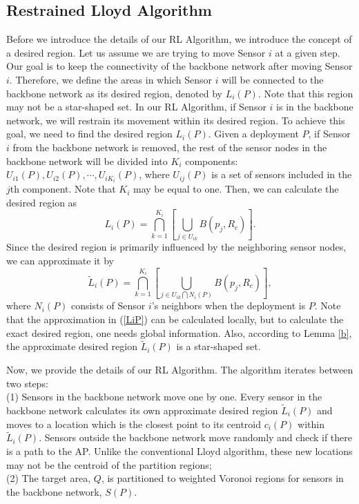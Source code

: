 \documentclass[journal,draftcls,onecolumn,12pt,twoside, narroweqnarray]{IEEEtran}
\begin{document}
\subsection{Restrained Lloyd Algorithm}
Before we introduce the details of our RL Algorithm, we introduce the concept of a desired region. Let us assume we are trying to move Sensor $i$ at a given step.
Our goal is to keep the connectivity of the backbone network after moving Sensor $i$. Therefore, we define the areas in which Sensor $i$ will be connected to the backbone network as its desired region, denoted by $L_i(P)$. Note that this region may not be a star-shaped set. In our RL Algorithm, if Sensor $i$ is in the backbone network, we will restrain its movement within its desired region. To achieve this goal, we need to find the desired region $L_i(P)$.
Given a deployment $P$, if Sensor $i$ from the backbone network is removed, the rest of the sensor nodes in the backbone network will be divided into $K_i$ components: $U_{i1}(P),U_{i2}(P),\cdots,U_{iK_i}(P)$, where $U_{ij}(P)$ is a set of sensors included in the $j$th component. Note that $K_i$ may be equal to one. Then, we can calculate the desired  region as
\begin{equation}
    L_i(P) = \bigcap_{k=1}^{K_i}\left[\bigcup_{j\in U_{ik}}B(p_j,R_c)\right].
\end{equation}
Since the desired region is primarily influenced by the neighboring sensor nodes, we can approximate it by
\begin{equation}
    \tilde{L}_i(P) = \bigcap_{k=1}^{K_i}\left[\bigcup_{j\in U_{ik}\bigcap N_i(P)}B(p_j,R_c)\right],\label{LiP}
\end{equation}
where $N_i(P)$ consists of Sensor $i$'s neighbors when the deployment is $P$. Note that the approximation in (\ref{LiP}) can be calculated locally, but to calculate the exact desired region, one needs global information. Also, according to Lemma \ref{b}, the approximate desired region $\tilde{L}_i(P)$ is a star-shaped set.

Now, we provide the details of our RL Algorithm. The algorithm iterates between two steps: \\
(1) Sensors in the backbone network move one by one. Every sensor in the backbone network calculates its own approximate desired region $\tilde{L}_i(P)$ and moves to a location which is the closest point to its centroid $c_i(P)$ within $\tilde{L}_i(P)$. Sensors outside the backbone network move randomly and check if there is a path to the AP. Unlike the conventional Lloyd algorithm, these new locations may not be the centroid of the partition regions;
\\
(2) The target area, $Q$, is partitioned to weighted Voronoi regions for sensors in the backbone network, $S(P)$.
\end{document}
